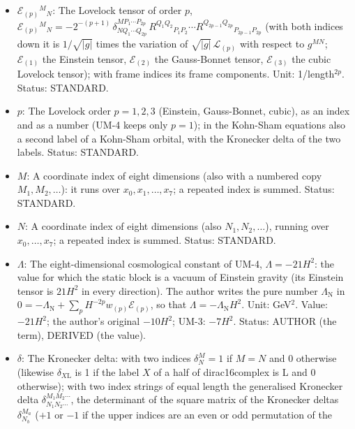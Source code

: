 \documentclass[
  10pt,
]{article}
\providecommand{\tightlist}{%
  \setlength{\itemsep}{0pt}\setlength{\parskip}{0pt}}
\begin{document}
\begin{itemize}
\tightlist
\item
  \(\mathcal{E}_{(p)}{}^M{}_N\): The Lovelock tensor of order \(p\),
  \(\mathcal{E}_{(p)}{}^M{}_N = -2^{-(p+1)}\,\delta^{MP_1\cdots P_{2p}}_{NQ_1\cdots Q_{2p}}\,R^{Q_1Q_2}{}_{P_1P_2}\cdots R^{Q_{2p-1}Q_{2p}}{}_{P_{2p-1}P_{2p}}\)
  (with both indices down it is \(1/\sqrt{\lvert g\rvert}\) times the
  variation of \(\sqrt{\lvert g\rvert}\,\mathcal{L}_{(p)}\) with respect
  to \(g^{MN}\); \(\mathcal{E}_{(1)}\) the Einstein tensor,
  \(\mathcal{E}_{(2)}\) the Gauss-Bonnet tensor, \(\mathcal{E}_{(3)}\)
  the cubic Lovelock tensor); with frame indices its frame components.
  Unit: 1/length\(^{2p}\). Status: STANDARD.
\item
  \(p\): The Lovelock order \(p = 1, 2, 3\) (Einstein, Gauss-Bonnet,
  cubic), as an index and as a number (UM-4 keeps only \(p = 1\)); in
  the Kohn-Sham equations also a second label of a Kohn-Sham orbital,
  with the Kronecker delta of the two labels. Status: STANDARD.
\item
  \(M\): A coordinate index of eight dimensions (also with a numbered
  copy \(M_1, M_2, \dots\)): it runs over \(x_0, x_1, \dots, x_7\); a
  repeated index is summed. Status: STANDARD.
\item
  \(N\): A coordinate index of eight dimensions (also
  \(N_1, N_2, \dots\)), running over \(x_0, \dots, x_7\); a repeated
  index is summed. Status: STANDARD.
\item
  \(\Lambda\): The eight-dimensional cosmological constant of UM-4,
  \(\Lambda = -21H^2\): the value for which the static block is a vacuum
  of Einstein gravity (its Einstein tensor is \(21H^2\) in every
  direction). The author writes the pure number \(\Lambda_{\mathrm{N}}\)
  in
  \(0 = -\Lambda_{\mathrm{N}} + \sum_p H^{-2p}w_{(p)}\mathcal{E}_{(p)}\),
  so that \(\Lambda = -\Lambda_{\mathrm{N}}H^2\). Unit: GeV\(^2\).
  Value: \(-21H^2\); the author's original \(-10H^2\); UM-3: \(-7H^2\).
  Status: AUTHOR (the term), DERIVED (the value).
\item
  \(\delta\): The Kronecker delta: with two indices \(\delta^M_N = 1\)
  if \(M = N\) and 0 otherwise (likewise \(\delta_{X\mathrm{L}}\) is 1
  if the label \(X\) of a half of dirac16complex is L and 0 otherwise);
  with two index strings of equal length the generalised Kronecker delta
  \(\delta^{M_1M_2\cdots}_{N_1N_2\cdots}\), the determinant of the
  square matrix of the Kronecker deltas \(\delta^{M_a}_{N_b}\) (\(+1\)
  or \(-1\) if the upper indices are an even or odd permutation of the

\end{itemize}
\end{document}
